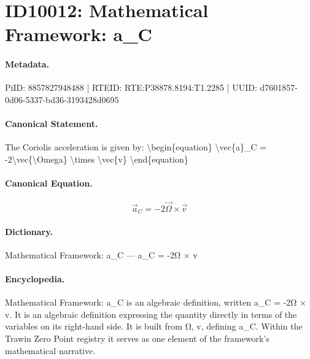\section*{ID10012: Mathematical Framework: a\_C}
\paragraph{Metadata.}
PiID: 8857827948488 | RTEID: RTE:P38878.8194:T1.2285 | UUID: d7601857-0d06-5337-bd36-3193428d0695

\paragraph{Canonical Statement.}
The Coriolis acceleration is given by: \textbackslash{}begin\{equation\} \textbackslash{}vec\{a\}\_C = -2\textbackslash{}vec\{\textbackslash{}Omega\} \textbackslash{}times \textbackslash{}vec\{v\} \textbackslash{}end\{equation\}

\paragraph{Canonical Equation.}
\[
\vec{a}_C = -2\vec{\Omega} \times \vec{v}
\]

\paragraph{Dictionary.}
Mathematical Framework: a\_C — a\_C = -2Ω × v

\paragraph{Encyclopedia.}
Mathematical Framework: a\_C is an algebraic definition, written a\_C = -2Ω × v. It is an algebraic definition expressing the quantity directly in terms of the variables on its right-hand side. It is built from Ω, v, defining a\_C. Within the Trawin Zero Point registry it serves as one element of the framework's mathematical narrative.
